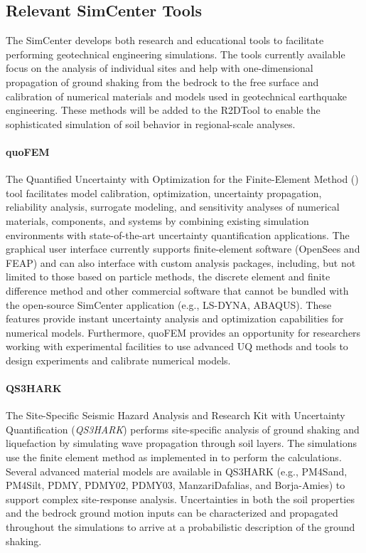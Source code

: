 \subsection{Relevant SimCenter Tools}

The SimCenter develops both research and educational tools to facilitate performing geotechnical engineering simulations. The tools currently available focus on the analysis of individual sites and help with one-dimensional propagation of ground shaking from the bedrock to the free surface and calibration of numerical materials and models used in geotechnical earthquake engineering. These methods will be added to the R2DTool to enable the sophisticated simulation of soil behavior in regional-scale analyses.

\paragraph{quoFEM} The Quantified Uncertainty with Optimization for the Finite-Element Method () tool facilitates model calibration, optimization, uncertainty propagation, reliability analysis, surrogate modeling, and sensitivity analyses of numerical materials, components, and systems by combining existing simulation environments with state-of-the-art uncertainty quantification applications. The graphical user interface currently supports finite-element software (OpenSees and FEAP) and can also interface with custom analysis packages, including, but not limited to those based on particle methods, the discrete element and finite difference method and other commercial software that cannot be bundled with the open-source SimCenter application (e.g., LS-DYNA, ABAQUS). These features provide instant uncertainty analysis and optimization capabilities for numerical models. Furthermore, quoFEM provides an opportunity for researchers working with experimental facilities to use advanced UQ methods and tools to design experiments and calibrate numerical models. 

\paragraph{QS3HARK} The Site-Specific Seismic Hazard Analysis and Research Kit with Uncertainty Quantification (\emph{QS3HARK}) performs site-specific analysis of ground shaking and liquefaction by simulating wave propagation through soil layers. The simulations use the finite element method as implemented in  to perform the calculations. Several advanced material models are available in QS3HARK (e.g., PM4Sand, PM4Silt, PDMY, PDMY02, PDMY03, ManzariDafalias, and Borja-Amies) to support complex site-response analysis. Uncertainties in both the soil properties and the bedrock ground motion inputs can be characterized and propagated throughout the simulations to arrive at a probabilistic description of the ground shaking.

